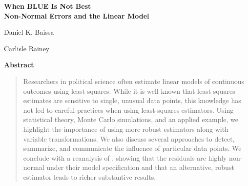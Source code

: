 \documentclass[12pt]{article}
\begin{document}
\begin{center}
{\LARGE \textbf{When BLUE Is Not Best}}\\\vspace{2mm}
{ \textbf{Non-Normal Errors and the Linear Model}}\\\vspace{2mm}


\vspace{10mm}

Daniel K. Baissa

\vspace{3mm}

Carlisle Rainey
\end{center}

\vspace{10mm}

{\centerline{\textbf{Abstract}}}
\begin{quote}\noindent
Researchers in political science often estimate linear models of continuous outcomes using least squares. 
While it is well-known that least-squares estimates are sensitive to single, unusual data points, this knowledge has not led to careful practices when using least-squares estimators. 
Using statistical theory, Monte Carlo simulations, and an applied example, we highlight the importance of using more robust estimators along with variable transformations.
We also discuss several approaches to detect, summarize, and communicate the influence of particular data points. 
We conclude with a reanalysis of \cite{ClarkGolder2006}, showing that the residuals are highly non-normal under their model specification and that an alternative, robust estimator leads to richer substantive results. 
 \end{quote}

\end{document}
